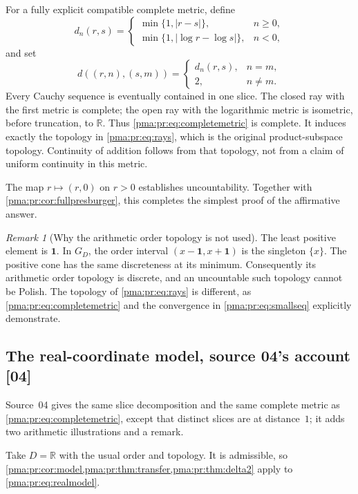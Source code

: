 \documentclass[11pt]{article}
\numberwithin{equation}{section}
\theoremstyle{definition}
\theoremstyle{remark}
\newtheorem{remark}[remark]{Remark}
\newcommand{\R}{\mathbb R}
\newcommand{\GD}{G_D}
\newcommand{\one}{\mathbf 1}
\newcommand{\src}[1]{\textup{\textsf{\small[#1]}}}
\begin{document}
For a fully explicit compatible complete metric, define
\[
 d_n(r,s)=
 \begin{cases}
 \min\{1,|r-s|\},&n\geq0,\\
 \min\{1,|\log r-\log s|\},&n<0,
 \end{cases}
\]
and set
\begin{equation}
 d((r,n),(s,m))=
 \begin{cases}d_n(r,s),&n=m,\\2,&n\neq m.\end{cases}
 \label{pma:pr:eq:completemetric}
\end{equation}
Every Cauchy sequence is eventually contained in one slice. The closed
ray with the first metric is complete; the open ray with the logarithmic
metric is isometric, before truncation, to $\R$. Thus \eqref{pma:pr:eq:completemetric}
is complete. It induces exactly the topology in \eqref{pma:pr:eq:rays}, which
is the original product-subspace topology. Continuity of addition follows
from that topology, not from a claim of uniform continuity in this metric.

The map $r\mapsto(r,0)$ on $r>0$ establishes uncountability.
Together with \cref{pma:pr:cor:fullpresburger}, this completes the simplest proof
of the affirmative answer.

\begin{remark}[Why the arithmetic order topology is not used]
The least positive element is $\one$. In $\GD$, the order interval
$(x-\one,x+\one)$ is the singleton $\{x\}$. The positive cone has the
same discreteness at its minimum. Consequently its arithmetic order
topology is discrete, and an uncountable such topology cannot be Polish.
The topology of \eqref{pma:pr:eq:rays} is different, as \eqref{pma:pr:eq:completemetric}
and the convergence in \eqref{pma:pr:eq:smallseq} explicitly demonstrate.
\end{remark}

\subsection{The real-coordinate model, source 04's account \src{04}}\label{pma:pr:sec:real}

Source~04 gives the same slice decomposition and the same complete metric as
\eqref{pma:pr:eq:completemetric}, except that distinct slices are at
distance~$1$; it adds two arithmetic illustrations and a remark.

Take $D=\R$ with the usual order and topology. It is admissible, so
\cref{pma:pr:cor:model,pma:pr:thm:transfer,pma:pr:thm:delta2} apply to \eqref{pma:pr:eq:realmodel}.
\end{document}

